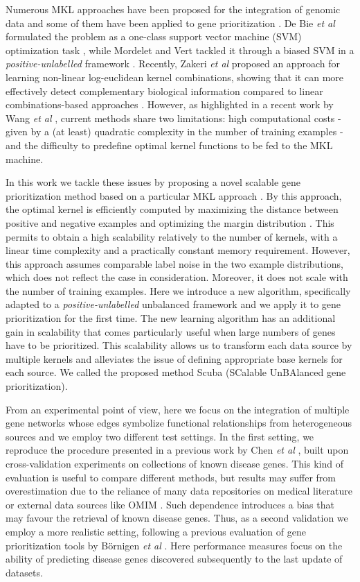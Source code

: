 \documentclass[twocolumn]{bmcart}%
\begin{document}
Numerous MKL approaches have been proposed for the integration of genomic data \cite{wang,borgwardt} and some of them have been applied to gene prioritization \cite{debie,mkl1class,prodige,zakeri}. De Bie \emph{et al} formulated the problem as a one-class support vector machine (SVM) optimization task \cite{debie}, while Mordelet and Vert tackled it through a biased SVM in a \emph{positive-unlabelled} framework \cite{prodige,chapelle}. Recently, Zakeri \emph{et al} proposed an approach for learning non-linear log-euclidean kernel combinations, showing that it can more effectively detect complementary biological information compared to linear combinations-based approaches \cite{zakeri}. However, as highlighted in a recent work by Wang \emph{et al} \cite{wang}, current methods share two limitations: high computational costs - given by a (at least) quadratic complexity in the number of training examples - and the difficulty to predefine optimal kernel functions to be fed to the MKL machine.

In this work we tackle these issues by proposing a novel scalable gene prioritization method based on a particular MKL approach \cite{easymkl}. By this approach, the optimal kernel is efficiently computed by maximizing the distance between positive and negative examples and optimizing the margin distribution \cite{komd}. This permits to obtain a high scalability relatively to the number of kernels, with a linear time complexity and a practically constant memory requirement. However, this approach assumes comparable label noise in the two example distributions, which does not reflect the case in consideration. Moreover, it does not scale with the number of training examples. Here we introduce a new algorithm, specifically adapted to a \emph{positive-unlabelled} unbalanced framework and we apply it to gene prioritization for the first time. The new learning algorithm has an additional gain in scalability that comes particularly useful when large numbers of genes have to be prioritized. This scalability allows us to transform each data source by multiple kernels and alleviates the issue of defining appropriate base kernels for each source. We called the proposed method Scuba (SCalable UnBAlanced gene prioritization).

From an experimental point of view, here we focus on the integration of multiple gene networks whose edges symbolize functional relationships from heterogeneous sources and we employ two different test settings. In the first setting, we reproduce the procedure presented in a previous work by Chen \emph{et al} \cite{f3pc}, built upon cross-validation experiments \cite{devijver} on collections of known disease genes. This kind of evaluation is useful to compare different methods, but results may suffer from overestimation due to the reliance of many data repositories on medical literature or external data sources like OMIM \cite{omim}. Such dependence introduces a bias that may favour the retrieval of known disease genes. Thus, as a second validation we employ a more realistic setting, following a previous evaluation of gene prioritization tools by B\"ornigen \emph{et al} \cite{bornigen}. Here performance measures focus on the ability of predicting disease genes discovered subsequently to the last update of datasets.
\end{document}
